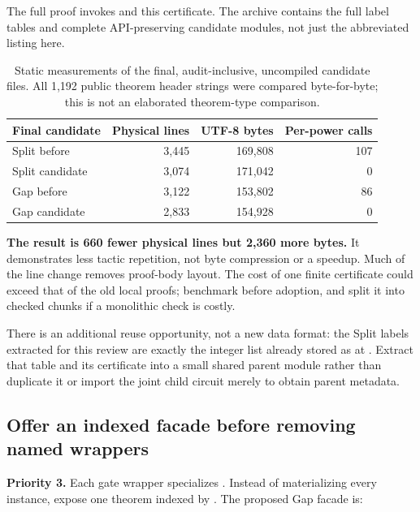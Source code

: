 The full  proof invokes  and this
certificate. The archive contains the full label tables and complete
API-preserving candidate modules, not just the abbreviated listing here.

\begin{table}[h]
\small
\begin{tabularx}{\linewidth}{@{}Yrrr@{}}
\toprule
Final candidate & Physical lines & UTF-8 bytes & Per-power  calls\\
\midrule
Split before & 3,445 & 169,808 & 107\\
Split candidate & 3,074 & 171,042 & 0\\
Gap before & 3,122 & 153,802 & 86\\
Gap candidate & 2,833 & 154,928 & 0\\
\bottomrule
\end{tabularx}
\caption{Static measurements of the final, audit-inclusive, uncompiled
candidate files. All 1,192 public theorem header strings were compared
byte-for-byte; this is not an elaborated theorem-type comparison.}
\end{table}

\textbf{The result is 660 fewer physical lines but 2,360 more bytes.}
It demonstrates less tactic repetition, not byte compression or a speedup.
Much of the line change removes proof-body layout. The cost of one finite
certificate could exceed that of the old local proofs; benchmark before
adoption, and split it into checked chunks if a monolithic check is costly.

There is an additional reuse opportunity, not a new data format: the Split
labels extracted for this review are exactly the integer list already stored
as  at
. Extract that table and its certificate
into a small shared parent module rather than duplicate it or import the
joint child circuit merely to obtain parent metadata.

\subsection{Offer an indexed facade before removing named wrappers}
\label{sec:indexed}

\textbf{Priority 3.} Each gate wrapper specializes
. Instead of materializing every instance, expose
one theorem indexed by . The proposed Gap facade is:

